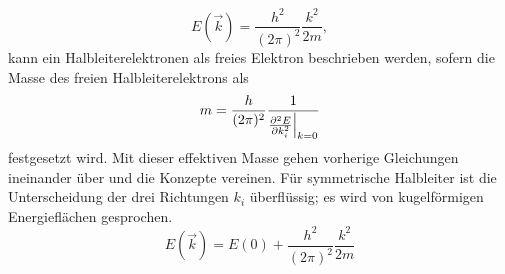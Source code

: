 \begin{equation}
    E(\vec k) = \frac{h^2}{(2\pi)^2}\frac{k^2}{2m},
\end{equation}
kann ein Halbleiterelektronen als freies Elektron beschrieben werden, sofern die Masse des freien Halbleiterelektrons als
\begin{equation}
    m = \frac{h}{(2\pi)^2}\frac{1}{\frac{\partial^2 E}{\partial k_i^2}\Bigl|_{k=0}}
\end{equation}
festgesetzt wird.
Mit dieser effektiven Masse gehen vorherige Gleichungen ineinander über und die Konzepte vereinen.
Für symmetrische Halbleiter ist die Unterscheidung der drei Richtungen $k_i$ überflüssig;
es wird von kugelförmigen Energieflächen gesprochen.
\begin{equation}
    E(\vec k) = E(0) + \frac{h^2}{(2\pi)^2}\frac{k^2}{2m}
\end{equation}
